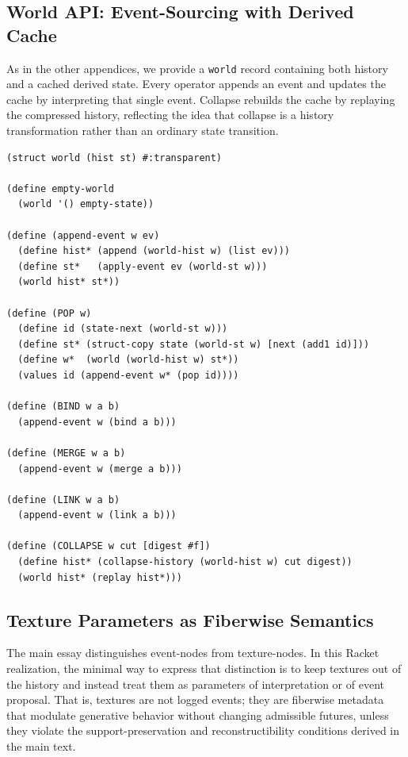 \documentclass[11pt]{article}
\begin{document}
\subsection{World API: Event-Sourcing with Derived Cache}

As in the other appendices, we provide a \texttt{world} record containing both
history and a cached derived state. Every operator appends an event and updates
the cache by interpreting that single event. Collapse rebuilds the cache by
replaying the compressed history, reflecting the idea that collapse is a
history transformation rather than an ordinary state transition.

\begin{verbatim}
(struct world (hist st) #:transparent)

(define empty-world
  (world '() empty-state))

(define (append-event w ev)
  (define hist* (append (world-hist w) (list ev)))
  (define st*   (apply-event ev (world-st w)))
  (world hist* st*))

(define (POP w)
  (define id (state-next (world-st w)))
  (define st* (struct-copy state (world-st w) [next (add1 id)]))
  (define w*  (world (world-hist w) st*))
  (values id (append-event w* (pop id))))

(define (BIND w a b)
  (append-event w (bind a b)))

(define (MERGE w a b)
  (append-event w (merge a b)))

(define (LINK w a b)
  (append-event w (link a b)))

(define (COLLAPSE w cut [digest #f])
  (define hist* (collapse-history (world-hist w) cut digest))
  (world hist* (replay hist*)))
\end{verbatim}

\subsection{Texture Parameters as Fiberwise Semantics}

The main essay distinguishes event-nodes from texture-nodes. In this Racket
realization, the minimal way to express that distinction is to keep textures
out of the history and instead treat them as parameters of interpretation or of
event proposal. That is, textures are not logged events; they are fiberwise
metadata that modulate generative behavior without changing admissible futures,
unless they violate the support-preservation and reconstructibility conditions
derived in the main text.
\end{document}
